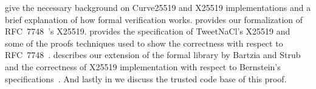  give the necessary background on Curve25519 and X25519
implementations and a brief explanation of how formal verification works.
 provides our formalization of RFC~7748~\cite{rfc7748}'s X25519.
 provides the specification of TweetNaCl's X25519 and some of the
proofs techniques used to show the correctness with respect to RFC~7748~\cite{rfc7748}.
 describes our extension of the formal library by Bartzia
and Strub and the correctness of X25519 implementation with respect to Bernstein's
specifications~\cite{Ber14}.
And lastly in  we discuss the trusted code base of this proof.



%
%
